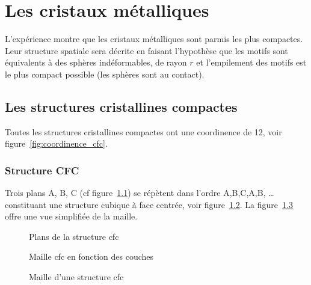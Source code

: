 \chapter{Les cristaux métalliques}
L'expérience montre que les cristaux métalliques sont parmis les plus
compactes. Leur structure spatiale sera décrite en faisant l'hypothèse
que les motifs sont équivalents à des sphères indéformables, de rayon
$r$ et l'empilement des motifs est le plus compact possible (les
sphères sont au contact).

\section{Les structures cristallines compactes}
Toutes les structures cristallines compactes ont une coordinence de
12, voir figure~\ref{fig:coordinence_cfc}.
\subsection{Structure CFC}
Trois plans A, B, C (cf figure~\ref{fig:plans_métal}) se répètent
dans l'ordre A,B,C,A,B, \dots constituant une structure cubique à face
centrée, voir figure~\ref{fig:maille_métal_couches}.
La figure~\ref{fig:maille_cfc} offre une vue simplifiée de la maille.
\begin{figure}
    \centering
    \qquad
    \qquad
    \caption{Plans de la structure cfc}\label{fig:plans_métal}
\end{figure}
\begin{figure}
    \centering
    \qquad
    \caption{Maille cfc
    en fonction des couches}\label{fig:maille_métal_couches}
\end{figure}
\begin{figure}
    \centering
    
    \caption{Maille d'une structure cfc}\label{fig:maille_cfc}
\end{figure}

